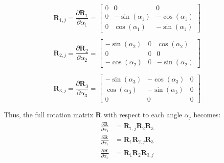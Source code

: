 \begin{equation}
\mathbf{R}_{1,j} = \frac{\partial \mathbf{R}_1}{\partial \alpha_{1}} = \begin{bmatrix}
0 & 0 & 0 \\
0 & -\sin(\alpha_{1}) & -\cos(\alpha_{1}) \\
0 & \cos(\alpha_{1}) & -\sin(\alpha_{1})
\end{bmatrix}
\end{equation}

\begin{equation}
\mathbf{R}_{2,j} = \frac{\partial \mathbf{R}_2}{\partial \alpha_{2}} = \begin{bmatrix}
-\sin(\alpha_{2}) & 0 & \cos(\alpha_{2}) \\
0 & 0 & 0 \\
-\cos(\alpha_{2}) & 0 & -\sin(\alpha_{2})
\end{bmatrix}
\end{equation}

\begin{equation}
\mathbf{R}_{3,j} = \frac{\partial \mathbf{R}_3}{\partial \alpha_{3}} = \begin{bmatrix}
-\sin(\alpha_{3}) & -\cos(\alpha_{3}) & 0 \\
\cos(\alpha_{3}) & -\sin(\alpha_{3}) & 0 \\
0 & 0 & 0
\end{bmatrix}
\end{equation}

Thus, the full rotation matrix \( \mathbf{R} \) with respect to each angle \( \alpha_{j} \) becomes:
\begin{align}
\frac{\partial \mathbf{R}}{\partial \alpha_{1}} &= \mathbf{R}_{1,j} \mathbf{R}_2 \mathbf{R}_3 \\
\frac{\partial \mathbf{R}}{\partial \alpha_{2}} &= \mathbf{R}_1 \mathbf{R}_{2,j} \mathbf{R}_3 \\
\frac{\partial \mathbf{R}}{\partial \alpha_{3}} &= \mathbf{R}_1 \mathbf{R}_2 \mathbf{R}_{3,j}
\end{align}


